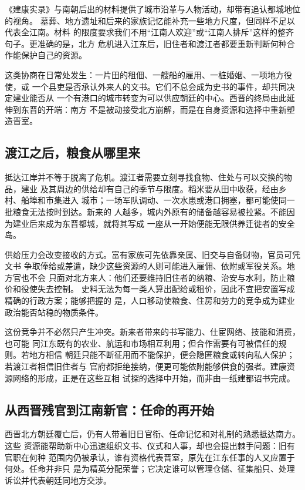 《建康实录》与南朝后出的材料提供了城市沿革与人物活动，却带有追认都城地位的视角。
墓葬、地方遗址和后来的家族记忆能补充一些地方尺度，但同样不足以代表全江南。材料
的限度要求我们不用“江南人欢迎”或“江南人排斥”这样的整齐句子。更准确的是，北方
危机进入江东后，旧住者和渡江者都要重新判断何种合作能保护自己的资源。

这类协商在日常处发生：一片田的租佃、一艘船的雇用、一桩婚姻、一项地方役使，或
一个县吏是否承认外来人的文书。它们不总会成为史书的事件，却共同决定建业能否从
一个有港口的城市转变为可以供应朝廷的中心。西晋的终局由此延伸到东晋的开端：南方
不是被动接受北方崩解，而是在自身资源和选择中重新塑造晋室。

\subsection{渡江之后，粮食从哪里来}

抵达江岸并不等于脱离了危机。渡江者需要立刻寻找食物、住处与可以交换的物品，建业
及其周边的供给却有自己的季节与限度。稻米要从田中收获，经由乡村、船埠和市集进入
城市；一场军队调动、一次水患或港口拥塞，都可能使同一批粮食无法按时到达。新来的
人越多，城内外原有的储备越容易被拉紧。不能因为建业后来成为东晋都城，就将其写成
一座从一开始便能无限供养迁徙者的安全岛。

供给压力会改变接收的方式。富有家族可先依靠亲属、旧交与自备财物，官员可凭文书
争取俸给或差遣，缺少这些资源的人则可能进入雇佣、依附或军役关系。地方官也不会
只面对北方来人：他们还要维持旧住者的纳粮、治安与水利，防止粮价和役使失去控制。
史料无法为每一类人算出配给或租价，因此不宜把安置写成精确的行政方案；能够把握的
是，人口移动使粮食、住房和劳力的竞争成为建业政治能否站稳的物质条件。

这份竞争并不必然只产生冲突。新来者带来的书写能力、仕宦网络、技能和消费，也可能
同江东既有的农业、航运和市场相互利用；但合作需要有可被信任的规则。若地方相信
朝廷只能不断征用而不能保护，便会隐匿粮食或转向私人保护；若渡江者相信旧住者与
官府都拒绝接纳，便更可能依附能够供食的强者。建康资源网络的形成，正是在这些互相
试探的选择中开始，而非由一纸建都诏书完成。

\subsection{从西晋残官到江南新官：任命的再开始}

西晋北方朝廷覆亡后，仍有人带着旧日官衔、任命记忆和对礼制的熟悉抵达南方。这些
资源能帮助新中心迅速组织文书、仪式和人事，却也会提出棘手问题：旧有官职在何种
范围内仍被承认，谁有资格代表晋室，原先在江东任事的人又应置于何处。任命并非只
是为精英分配荣誉；它决定谁可以管理仓储、征集船只、处理诉讼并代表朝廷同地方交涉。

